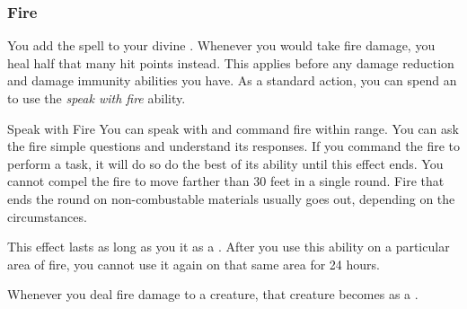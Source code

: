         \subsubsection{Fire}
             You add the  spell to your divine .
             Whenever you would take fire damage, you heal half that many hit points instead.
            This applies before any damage reduction and damage immunity abilities you have.
             As a standard action, you can spend an  to use the \textit{speak with fire} ability.
            \begin{ability}{Speak with Fire}
                You can speak with and command fire within \rnglong range.
                You can ask the fire simple questions and understand its responses.
                If you command the fire to perform a task, it will do so do the best of its ability until this effect ends.
                You cannot compel the fire to move farther than 30 feet in a single round.
                Fire that ends the round on non-combustable materials usually goes out, depending on the circumstances.

                This effect lasts as long as you  it as a .
                After you use this ability on a particular area of fire, you cannot use it again on that same area for 24 hours.
            \end{ability}
             Whenever you deal fire damage to a creature, that creature becomes \ignited as a .


